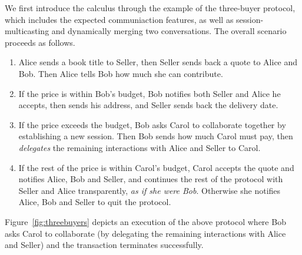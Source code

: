 \documentclass{article}
\begin{document}
We first introduce the calculus through the example of the three-buyer protocol,
which includes the expected communiaction features, as well as session-multicasting and
dynamically merging two conversations.
The overall scenario  proceeds as follows.
\begin{enumerate}
\item
Alice sends a book title to Seller, then Seller sends back a quote
to Alice and Bob. Then Alice tells Bob how much she can contribute.

\item
If the price is within Bob's budget, Bob notifies both Seller and
Alice he accepts, then sends his address, and Seller sends back the
delivery date.

\item
If the price exceeds the budget, Bob asks Carol to collaborate
together by establishing a new session. Then Bob sends how much
Carol must pay, then {\em delegates} the remaining interactions with
Alice and Seller to Carol.

\item
If the rest of the price is within Carol's budget, Carol accepts the
quote and notifies Alice, Bob and Seller, and continues the rest of
the protocol with Seller and Alice transparently, {\em as if she were
Bob}. Otherwise she notifies Alice, Bob and Seller to quit the
protocol.\vspace{-2mm}
\end{enumerate}

Figure~\ref{fig:threebuyers} depicts an execution of the above
protocol where Bob asks Carol to collaborate (by delegating the
remaining interactions with Alice and Seller) and the transaction
terminates successfully.
\end{document}
